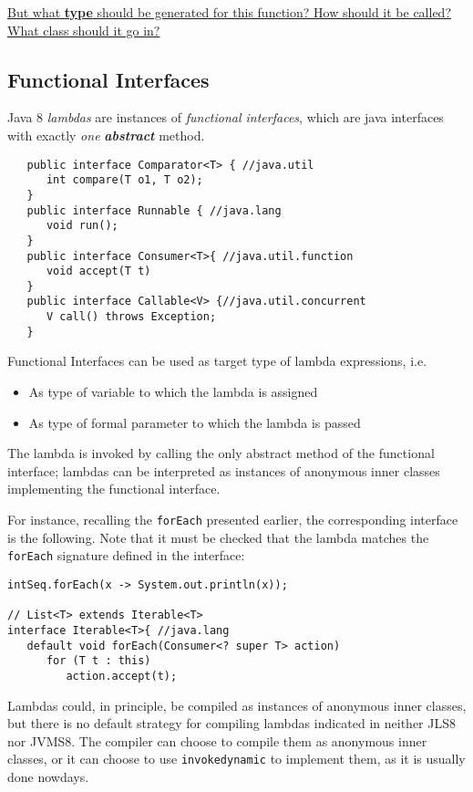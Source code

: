 \ul{But what \textbf{type} should be generated for this function? How
should it be called? What class should it go in?}

\subsection{Functional Interfaces}

Java 8 \textit{lambdas} are instances of \textit{functional interfaces},
which are java interfaces with exactly \textit{one} \textit{\textbf{abstract}} method.

\begin{lstlisting}
   public interface Comparator<T> { //java.util
      int compare(T o1, T o2);
   }
   public interface Runnable { //java.lang
      void run();
   }
   public interface Consumer<T>{ //java.util.function
      void accept(T t)
   }
   public interface Callable<V> {//java.util.concurrent
      V call() throws Exception;
   }
\end{lstlisting}
{Functional Interfaces can be used as target type of lambda
expressions, i.e.\ns
\begin{itemize}
	\item As type of variable to which the lambda is assigned
	\item As type of formal parameter to which the lambda is passed
\end{itemize}}

The lambda is invoked by calling the only abstract method
of the functional interface;
lambdas can be interpreted as instances of anonymous
inner classes implementing the functional interface.

For instance, recalling the \lstinline|forEach| presented earlier, the corresponding interface is the following.
Note that it must be checked that the lambda matches the \lstinline|forEach| signature defined in the interface:
\begin{lstlisting}
intSeq.forEach(x -> System.out.println(x));

// List<T> extends Iterable<T>
interface Iterable<T>{ //java.lang
   default void forEach(Consumer<? super T> action)
      for (T t : this)
         action.accept(t);
\end{lstlisting}

Lambdas could, in principle, be compiled as instances of anonymous inner classes, but there is no default strategy for compiling lambdas indicated in neither JLS8 nor JVMS8. The compiler can choose to compile them as anonymous inner classes, or it can choose to use \lstinline|invokedynamic| to implement them, as it is usually done nowdays.

